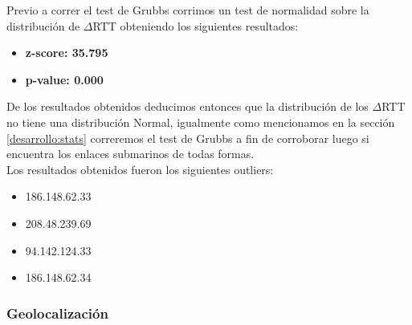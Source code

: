 Previo a correr el test de Grubbs corrimos un test de normalidad sobre la distribución de $\Delta$RTT obteniendo los siguientes resultados:

\begin{itemize}
\item \textbf{z-score: 35.795}
\item \textbf{p-value: 0.000}
\end{itemize}

De los resultados obtenidos deducimos entonces que la distribución de los $\Delta$RTT no tiene una distribución Normal, igualmente como mencionamos en la sección \ref{desarrollo:stats} correremos el test de Grubbs a fin de corroborar luego si encuentra los enlaces submarinos de todas formas.\\
Los resultados obtenidos fueron los siguientes outliers:

\begin{itemize}
\item 186.148.62.33
\item 208.48.239.69
\item 94.142.124.33
\item 186.148.62.34
\end{itemize}


\subsubsection{Geolocalización}

